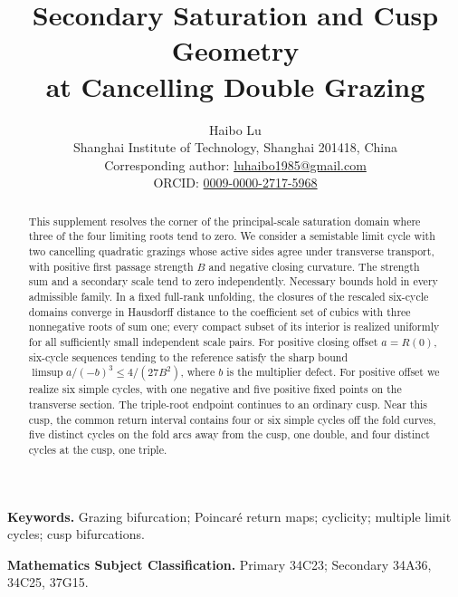 \documentclass[11pt]{article}
\title{Secondary Saturation and Cusp Geometry\\at Cancelling Double Grazing}
\author{Haibo Lu\\[2pt]
\small Shanghai Institute of Technology, Shanghai 201418, China\\
\small Corresponding author: \href{mailto:luhaibo1985@gmail.com}{luhaibo1985@gmail.com}\\
\small ORCID: \href{https://orcid.org/0009-0000-2717-5968}{0009-0000-2717-5968}}
\date{}
\theoremstyle{definition}
\theoremstyle{remark}
\numberwithin{equation}{section}
\begin{document}
\maketitle
\begin{abstract}
This supplement resolves the corner of the principal-scale saturation
domain where three of the four limiting roots tend to zero. We consider
a semistable limit cycle with two cancelling quadratic grazings whose active
sides agree under transverse transport, with positive first passage strength
$B$ and negative closing curvature.
The strength sum and a secondary scale tend to zero independently.
Necessary bounds hold in every admissible family. In a fixed full-rank
unfolding, the closures of the rescaled six-cycle domains converge in
Hausdorff distance to the coefficient set of cubics with three nonnegative
roots of sum one; every compact subset of its interior is realized
uniformly for all sufficiently small independent scale pairs.
For positive closing offset $a=R(0)$, six-cycle sequences tending to the
reference satisfy the sharp bound $\limsup a/(-b)^3\le4/(27B^2)$, where
$b$ is the multiplier defect. For positive offset we realize six simple
cycles, with one negative and five positive fixed points on the transverse
section. The triple-root endpoint continues to an ordinary cusp.
Near this cusp, the common return interval contains four or six simple cycles
off the fold curves, five distinct cycles on the fold arcs away from the
cusp, one double, and four distinct cycles at the cusp, one triple.
\end{abstract}
\noindent\textbf{Keywords.} Grazing bifurcation; Poincar\'e return maps;
cyclicity; multiple limit cycles; cusp bifurcations.
\par\smallskip
\noindent\textbf{Mathematics Subject Classification.}
Primary 34C23; Secondary 34A36, 34C25, 37G15.
\par\smallskip







\end{document}
